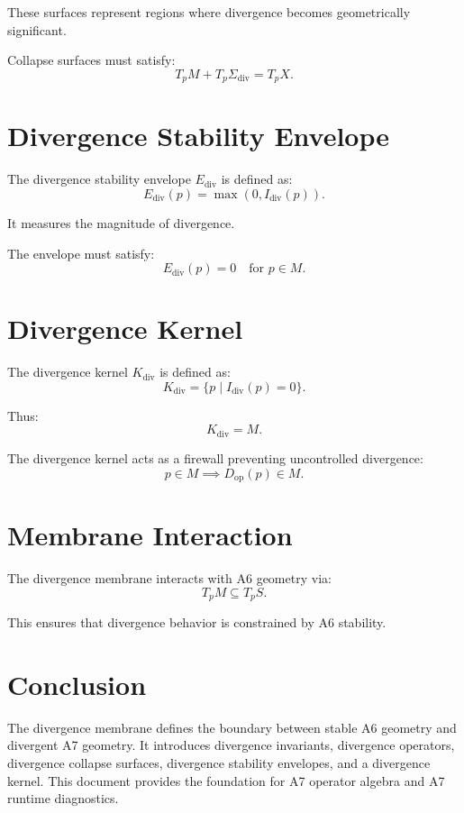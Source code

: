 \documentclass[11pt]{article}
\begin{document}
These surfaces represent regions where divergence becomes geometrically
significant.

Collapse surfaces must satisfy:
\[
T_p M + T_p \Sigma_{\text{div}} = T_p X.
\]

\section{Divergence Stability Envelope}
The divergence stability envelope $E_{\text{div}}$ is defined as:
\[
E_{\text{div}}(p) = \max(0, I_{\text{div}}(p)).
\]

It measures the magnitude of divergence.

The envelope must satisfy:
\[
E_{\text{div}}(p) = 0 \quad \text{for } p \in M.
\]

\section{Divergence Kernel}
The divergence kernel $K_{\text{div}}$ is defined as:
\[
K_{\text{div}} = \{ p \mid I_{\text{div}}(p) = 0 \}.
\]

Thus:
\[
K_{\text{div}} = M.
\]

The divergence kernel acts as a firewall preventing uncontrolled divergence:
\[
p \in M \implies D_{\text{op}}(p) \in M.
\]

\section{Membrane Interaction}
The divergence membrane interacts with A6 geometry via:
\[
T_p M \subseteq T_p S.
\]

This ensures that divergence behavior is constrained by A6 stability.

\section*{Conclusion}
The divergence membrane defines the boundary between stable A6 geometry and
divergent A7 geometry. It introduces divergence invariants, divergence operators,
divergence collapse surfaces, divergence stability envelopes, and a divergence
kernel. This document provides the foundation for A7 operator algebra and
A7 runtime diagnostics.
\end{document}
